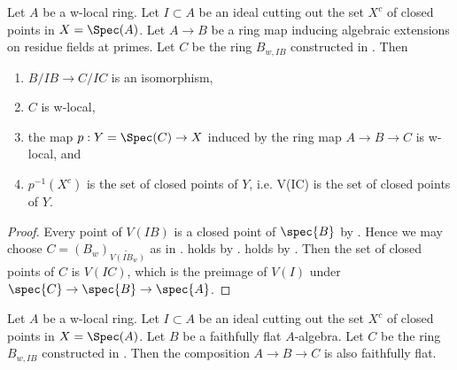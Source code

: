 \begin{lemma}
\label{thm:closed-points-isom-w-local}
\leanok
Let $A$ be a w-local ring. Let $I \subset A$ be an ideal cutting out the set $X^c$ of closed points in $X = \Spec (A)$.
Let $A \to B$ be a ring map inducing algebraic extensions on residue fields at primes. Let $C$ be the ring $B_{w, IB}$ constructed in . Then
\begin{enumerate}
    \item $B/IB \to C/IC$ is an isomorphism, \label{item:quotinet-isom-closed-points-isom-w-local} %
    \item $C$ is w-local, \label{item:w-local-closed-points-isom-w-local}
    \item the map $p: Y = \Spec (C) \to X$ induced by the ring map $A \to B \to C$ is w-local, and %
    \item $p^{-1}(X^c)$ is the set of closed points of $Y$, i.e. V(IC) is the set of closed points of $Y$. \label{item:inverse-image-closed-points-isom-w-local}
\end{enumerate}
\end{lemma}

\begin{proof}
    \leanok
    Every point of $V(IB)$ is a closed point of $\spec{B}$ by 
    .
    Hence we may choose $C = (B_w)_{\widetilde{V(IB_w)}}$ as in 
    .  holds
    by . 
     holds by 
    . Then
    the set of closed points of $C$ is $V(IC)$, which is the preimage of $V(I)$ under
    $\spec{C} \to \spec{B} \to \spec{A}$.
\end{proof}

\begin{lemma}
  Let $A$ be a w-local ring. Let $I \subset A$ be an ideal cutting out the set $X^c$ of closed points in $X = \Spec (A)$.
  Let $B$ be a faithfully flat $A$-algebra. Let $C$ be the ring $B_{w, IB}$ constructed in . Then
  the composition $A \to B \to C$ is also faithfully flat.
  \label{cor:closed-points-isom-w-local-faithfully-flat}
  \leanok
\end{lemma}

